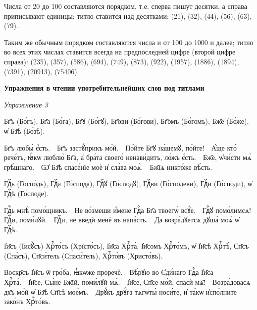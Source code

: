 \documentclass[11pt,a4paper,oneside]{memoir}
\begin{document}
    Числа от 20 до 100 составляются порядком, т.е. сперва пишут десятки, а справа приписывают единицы; титло ставится над десятками: {} (21), {} (32), {} (44), {} (56), {} (63), {} (79).
    
    Таким же обычным порядком составляются числа и от 100 до 1000 и далее; титло во всех этих числах ставится всегда на предпоследней цифре (второй цифре справа): {} (235), {} (357), {} (586), {} (694), {} (749), {} (873), {} (922), {} (1957), {} (1886), {} (1894), {} (7391), {} (20913), {} (75406).
    \bigskip

    \textbf{Упражнения в чтении употребительнейших слов под титлами}
    
    \begin{flushright}
    \emph{Упражнение 3}
    \end{flushright}
    \medskip
    
    \begin{slv}
        Бг҃ъ (Бо́гъ), Бг҃а (Бо́га), Бг҃ꙋ (Бо́гꙋ), Бг҃ови (Бо́гови), Бг҃омъ (Бо́гомъ), Бж҃е (Бо́же), ѡ҆ Бз҃ѣ (Бо́зѣ).
        
        Бг҃ъ любы̀ є҆́сть.~\textemdash~Бг҃ъ застꙋ́прикъ мо́й.~\textemdash~По́йте Бг҃ꙋ на́шемꙋ, по́йте!~\textemdash~А҆́ще кто̀ рече́тъ, ꙗ҆́кѡ люблю̀ Бг҃а, а҆ бра́та своего̀ ненави́дитъ, ло́жъ є҆́сть.~\textemdash~Бж҃е, ѡ҆чи́сти мѧ̀ грѣ́шнаго.~\textemdash~Ѡ҆ Бз҃ѣ спасе́нїе моѐ и҆ сла́ва моѧ̀.~\textemdash~Бж҃їѧ никто́же вѣ́сть.
        
        Гдⷭ҇ь (Госпо́дь), Гдⷭ҇а (Го́спода), Гдⷭ҇ꙋ (Го́сподꙋ), Гдⷭ҇ви (Го́сподеви), Гдⷭ҇и (Го́споди), ѡ҆ Гдⷭ҇ѣ (Го́споде).
        
        Гдⷭ҇ь мнѣ̀ помо́щникъ.~\textemdash~Не во́змеши и҆́мене Гдⷭ҇а Бг҃а твоегѡ̀ всꙋ́е.~\textemdash~Гдⷭ҇ꙋ помо́лимсѧ! Гдⷭ҇и, поми́лꙋй.~\textemdash~Гдⷭ҇и, не введѝ менѐ въ напа́сть.~\textemdash~Да возра́дꙋетсѧ дꙋша̀ моѧ̀ ѡ҆ Гдⷭ҇ѣ.
        
        І҆и҃съ (І҆исꙋ̀съ) Хрⷭ҇то́съ (Хрїсто́съ), І҆и҃са Хрⷭ҇та̀, І҆и҃сомъ Хрⷭ҇то́мъ, ѡ҆ І҆и҃сѣ Хрⷭ҇тѣ̀, Сп҃съ (Спа́съ), Сп҃си́тель (Спаси́тель), Хрⷭ҇то́въ (Христо́въ).
        
        Воскр҃съ І҆и҃съ ѿ гро́ба, ꙗ҆́кѡже проречѐ.~\textemdash~Вѣ́рꙋю во Є҆ди́наго Гдⷭ҇а І҆и҃са Хрⷭ҇та̀.~\textemdash~І҆и҃се, Сы́не Бж҃їй, поми́лꙋй мѧ̀.~\textemdash~І҆и҃се, Сп҃се мо́й, спасѝ мѧ҃!~\textemdash~Возра́довасѧ дх҃ъ мо́й ѡ҆ Бз҃ѣ Сп҃сѣ мое́мъ.~\textemdash~Дрꙋ́къ дрꙋ́га тѧгѡты̀ носи́те, и҆ та́кѡ и҆спо́лните зако́нъ Хрⷭ҇то́въ.
    \end{slv}
\end{document}
